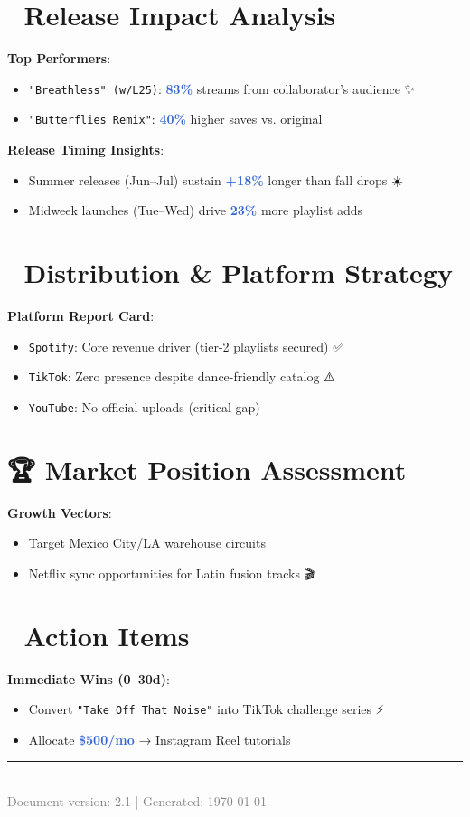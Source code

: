 \documentclass[11pt]{article}
\newcommand{\platform}[1]{\textcolor{accent}{\texttt{#1}}}
\newcommand{\metric}[1]{\textcolor{highlight}{\textbf{#1}}}
\newcommand{\icon}[1]{{\emojifont\scriptsize#1}}
\begin{document}
\section*{🎵 Release Impact Analysis}
\textbf{Top Performers}:
\begin{itemize}
\item \platform{"Breathless" (w/L25)}: \metric{83\%} streams from collaborator's audience \icon{✨}
\item \platform{"Butterflies Remix"}: \metric{40\%} higher saves vs. original \icon{🚀}
\end{itemize}

\textbf{Release Timing Insights}:
\begin{itemize}
\item Summer releases (Jun–Jul) sustain \metric{+18\%} longer than fall drops \icon{☀️}
\item Midweek launches (Tue–Wed) drive \metric{23\%} more playlist adds \icon{📅}
\end{itemize}

\section*{📱 Distribution \& Platform Strategy}
\textbf{Platform Report Card}:
\begin{itemize}
\item \platform{Spotify}: Core revenue driver (tier-2 playlists secured) \icon{✅}
\item \platform{TikTok}: Zero presence despite dance-friendly catalog \icon{⚠️}
\item \platform{YouTube}: No official uploads (critical gap) \icon{🚨}
\end{itemize}

\section*{🏆 Market Position Assessment}
\textbf{Growth Vectors}:
\begin{itemize}
\item Target Mexico City/LA warehouse circuits \icon{📍}
\item Netflix sync opportunities for Latin fusion tracks \icon{🎬}
\end{itemize}

\section*{🚀 Action Items}
\textbf{Immediate Wins (0–30d)}:
\begin{itemize}
\item Convert \platform{"Take Off That Noise"} into TikTok challenge series \icon{⚡}
\item Allocate \metric{\$500/mo} → Instagram Reel tutorials \icon{💸}
\end{itemize}

\vspace*{10pt}
\begin{center}
\rule{0.8\textwidth}{0.5pt}\\[-2pt]
\small\sffamily\textcolor{gray}{Document version: 2.1 | Generated: \today}
\end{center}
\end{document}
